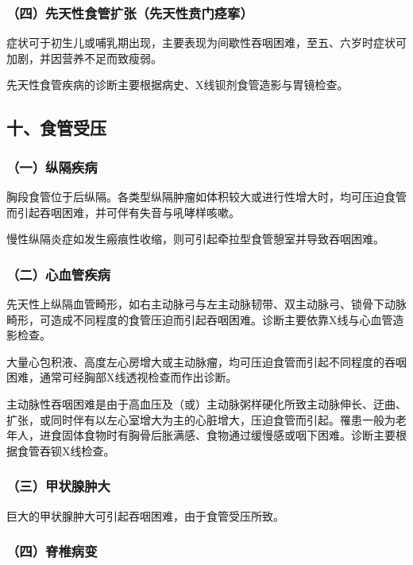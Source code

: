 \subsubsection{（四）先天性食管扩张（先天性贲门痉挛）}

症状可于初生儿或哺乳期出现，主要表现为间歇性吞咽困难，至五、六岁时症状可加剧，并因营养不足而致瘦弱。

先天性食管疾病的诊断主要根据病史、X线钡剂食管造影与胃镜检查。

\subsection{十、食管受压}

\subsubsection{（一）纵隔疾病}

胸段食管位于后纵隔。各类型纵隔肿瘤如体积较大或进行性增大时，均可压迫食管而引起吞咽困难，并可伴有失音与吼哮样咳嗽。

慢性纵隔炎症如发生瘢痕性收缩，则可引起牵拉型食管憩室并导致吞咽困难。

\subsubsection{（二）心血管疾病}

先天性上纵隔血管畸形，如右主动脉弓与左主动脉韧带、双主动脉弓、锁骨下动脉畸形，可造成不同程度的食管压迫而引起吞咽困难。诊断主要依靠X线与心血管造影检查。

大量心包积液、高度左心房增大或主动脉瘤，均可压迫食管而引起不同程度的吞咽困难，通常可经胸部X线透视检查而作出诊断。

主动脉性吞咽困难是由于高血压及（或）主动脉粥样硬化所致主动脉伸长、迂曲、扩张，或同时伴有以左心室增大为主的心脏增大，压迫食管而引起。罹患一般为老年人，进食固体食物时有胸骨后胀满感、食物通过缓慢感或咽下困难。诊断主要根据食管吞钡X线检查。

\subsubsection{（三）甲状腺肿大}

巨大的甲状腺肿大可引起吞咽困难，由于食管受压所致。

\subsubsection{（四）脊椎病变}

